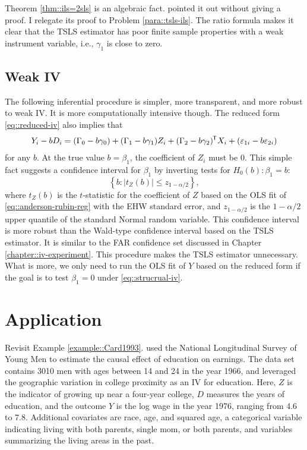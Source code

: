 Theorem \ref{thm::ils=2sls} is an algebraic fact. 
\citet[][Section A.3]{imbens2014instrumental} pointed it out without giving a proof. 
I relegate its proof to Problem \ref{para::tsls-ils}. The ratio formula makes it clear that the TSLS estimator has poor finite sample properties with a weak instrument variable, i.e., $\gamma_1 $ is close to zero. 



\subsection{Weak IV}

The following inferential procedure is simpler, more transparent, and more robust to weak IV. It is more computationally intensive though. 
The reduced form \eqref{eq::reduced-iv}  also implies that
\begin{eqnarray}
\label{eq::anderson-rubin-reg}
Y_i  - bD_i = (\Gamma_0 -b \gamma_0 ) +  (\Gamma_1  - b \gamma_1 ) Z_i
+ (\Gamma_2 - b \gamma_2  ) \tran X_i  + ( \varepsilon_{1i} -  b \varepsilon_{2i} )
\end{eqnarray}
for any $b$. 
At the true value $b = \beta_1$, the coefficient of $Z_i$ must be $0$. This simple fact suggests a confidence interval for $\beta_1$ by inverting tests for $H_0(b): \beta_1 = b$:
$$
\left\{ b:  | t_Z(b) | \leq z_{1-\alpha/2} \right\},
$$
where $t_Z(b) $ is the $t$-statistic for the coefficient of $Z$ based on the OLS fit of \eqref{eq::anderson-rubin-reg} with the EHW standard error, and $z_{1-\alpha/2}$ is the $1-\alpha/2$ upper quantile of the standard Normal random variable. 
This confidence interval is more robust than the Wald-type confidence interval based on the TSLS estimator. It is similar to the  FAR confidence set discussed in Chapter \ref{chapter::iv-experiment}. This procedure makes the TSLS estimator unnecessary. What is more, we only need to run the OLS fit of $Y$ based on the reduced form if the goal is to test $\beta_1 = 0$ under \eqref{eq::strucrual-iv}. 



\section{Application}\label{sec::tsls-application}

 

Revisit Example \ref{example::Card1993}. 
\citet{card1993using} used the National Longitudinal Survey of Young Men to estimate the causal effect of education on earnings. The data set contains 3010 men with ages between 14 and 24 in the year 1966, and \citet{card1993using} leveraged the geographic variation in college proximity as an IV for education. Here, $Z$ is the indicator of growing up near a four-year college, $D$ measures the years of education, and the outcome $Y$ is the log wage in the year 1976, ranging from 4.6 to 7.8. Additional covariates are race, age, and squared age, a categorical variable indicating living with both parents, single mom, or both parents, and variables summarizing the living areas in the past. 



